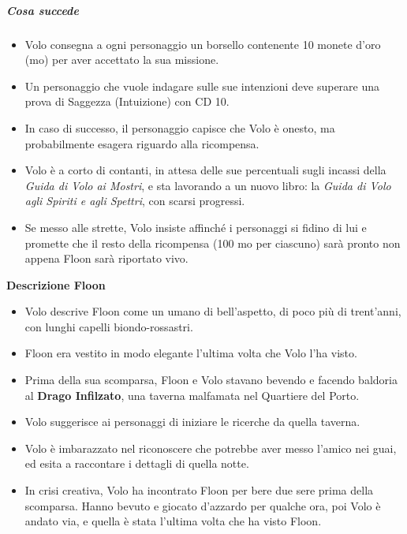 \documentclass{article}
\begin{document}
\subparagraph{Cosa succede} \begin{itemize}
    \item Volo consegna a ogni personaggio un borsello contenente 10 monete d'oro (mo) per aver accettato la sua missione.
    \item Un personaggio che vuole indagare sulle sue intenzioni deve superare una prova di Saggezza (Intuizione) con CD 10.
    \item In caso di successo, il personaggio capisce che Volo è onesto, ma probabilmente esagera riguardo alla ricompensa.
    \item Volo è a corto di contanti, in attesa delle sue percentuali sugli incassi della \textit{Guida di Volo ai Mostri}, e sta lavorando a un nuovo libro: la \textit{Guida di Volo agli Spiriti e agli Spettri}, con scarsi progressi.
    \item Se messo alle strette, Volo insiste affinché i personaggi si fidino di lui e promette che il resto della ricompensa (100 mo per ciascuno) sarà pronto non appena Floon sarà riportato vivo.
\end{itemize}
\textbf{Descrizione Floon} 
\begin{itemize}
    \item Volo descrive Floon come un umano di bell'aspetto, di poco più di trent'anni, con lunghi capelli biondo-rossastri.
    \item Floon era vestito in modo elegante l'ultima volta che Volo l'ha visto.
    \item Prima della sua scomparsa, Floon e Volo stavano bevendo e facendo baldoria al \textbf{Drago Infilzato}, una taverna malfamata nel Quartiere del Porto.
    \item Volo suggerisce ai personaggi di iniziare le ricerche da quella taverna.
    \item Volo è imbarazzato nel riconoscere che potrebbe aver messo l'amico nei guai, ed esita a raccontare i dettagli di quella notte.
    \item In crisi creativa, Volo ha incontrato Floon per bere due sere prima della scomparsa. Hanno bevuto e giocato d'azzardo per qualche ora, poi Volo è andato via, e quella è stata l'ultima volta che ha visto Floon.
\end{itemize}
\end{document}
